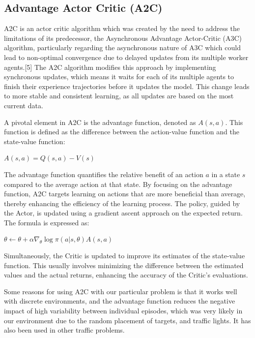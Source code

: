 \documentclass{article}
\begin{document}
	\subsection{Advantage Actor Critic (A2C)}
	\label{a2c}
	A2C is an actor critic algorithm which was created by the need to address the limitations of its predecessor, the Asynchronous Advantage Actor-Critic (A3C) algorithm, particularly regarding the asynchronous nature of A3C which could lead to non-optimal convergence due to delayed updates from its multiple worker agents.[5] The A2C algorithm modifies this approach by implementing synchronous updates, which means it waits for each of its multiple agents to finish their experience trajectories before it updates the model. This change leads to more stable and consistent learning, as all updates are based on the most current data.
	
	A pivotal element in A2C is the advantage function, denoted as \( A(s, a) \). This function is defined as the difference between the action-value function and the state-value function: 
	
	\begin{center}
		$A(s, a) = Q(s, a) - V(s)$
	\end{center}
	
	The advantage function quantifies the relative benefit of an action \( a \) in a state \( s \) compared to the average action at that state. By focusing on the advantage function, A2C targets learning on actions that are more beneficial than average, thereby enhancing the efficiency of the learning process. The policy, guided by the Actor, is updated using a gradient ascent approach on the expected return. The formula is expressed as: 
	\begin{center}
		$\theta \leftarrow \theta + \alpha \nabla_{\theta} \log \pi(a | s, \theta) A(s, a)$
	\end{center}
	
	Simultaneously, the Critic is updated to improve its estimates of the state-value function. This usually involves minimizing the difference between the estimated values and the actual returns, enhancing the accuracy of the Critic's evaluations.
	
	Some reasons for using A2C with our particular problem is that it works well with discrete environments, and the advantage function reduces the negative impact of high variability between individual episodes, which was very likely in our environment due to the random placement of targets, and traffic lights. It has also been used in other traffic problems.
	
\end{document}
